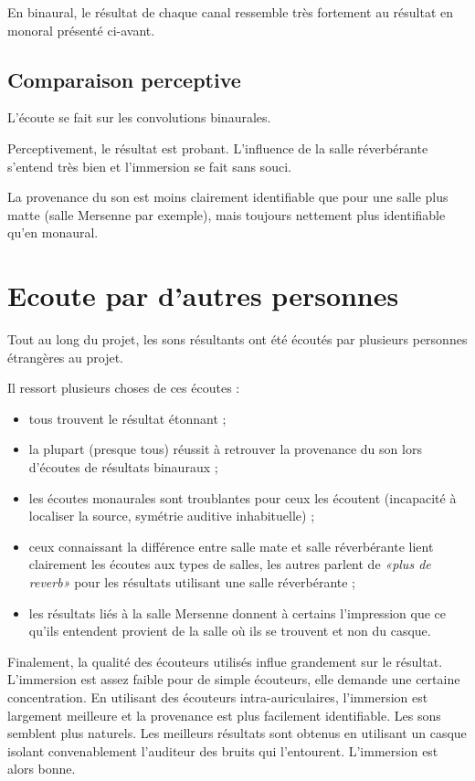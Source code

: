 En binaural, le résultat de chaque canal ressemble très fortement au résultat en monoral présenté ci-avant.

\subsection{Comparaison perceptive} %

L'écoute se fait sur les convolutions binaurales.

Perceptivement, le résultat est probant. L'influence de la salle réverbérante s'entend très bien et l'immersion se fait
sans souci.

La provenance du son est moins clairement identifiable que pour une salle plus matte (salle Mersenne par exemple),
mais toujours nettement plus identifiable qu'en monaural.

\section{Ecoute par d'autres personnes} %

Tout au long du projet, les sons résultants ont été écoutés par plusieurs personnes étrangères au projet.

Il ressort plusieurs choses de ces écoutes :

\begin{itemize}
    \item tous trouvent le résultat étonnant ;
    \item la plupart (presque tous) réussit à retrouver la provenance du son lors d'écoutes de résultats binauraux ;
    \item les écoutes monaurales sont troublantes pour ceux les écoutent (incapacité à localiser la source, symétrie 
    auditive inhabituelle) ;
    \item ceux connaissant la différence entre salle mate et salle réverbérante lient clairement les écoutes aux types
    de salles, les autres parlent de \textit{«plus de reverb»} pour les résultats utilisant une salle réverbérante ;
    \item les résultats liés à la salle Mersenne donnent à certains l'impression que ce qu'ils entendent provient de la
    salle où ils se trouvent et non du casque.
\end{itemize}

Finalement, la qualité des écouteurs utilisés influe grandement sur le résultat. L'immersion est assez faible pour de
simple écouteurs, elle demande une certaine concentration. En utilisant des écouteurs intra-auriculaires, l'immersion
est largement meilleure et la provenance est plus facilement identifiable. Les sons semblent plus naturels. Les
meilleurs résultats sont obtenus en utilisant un casque isolant convenablement l'auditeur des bruits qui l'entourent.
L'immersion est alors bonne.
